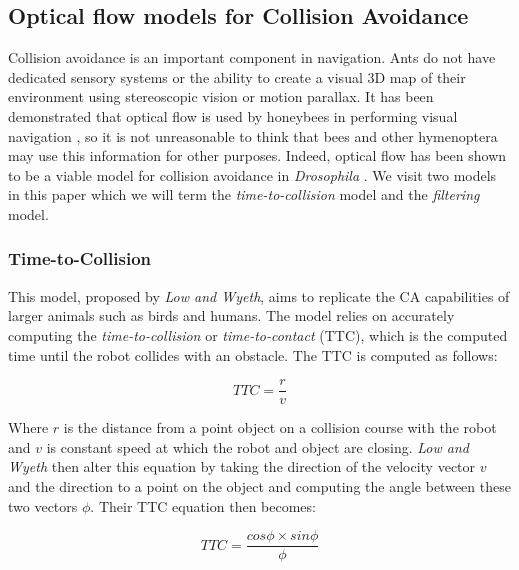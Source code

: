 \documentclass[a4paper,11pt,twoside,openright]{article}
\begin{document}
\subsection{ Optical flow models for Collision Avoidance } \label{sec:ofca}
Collision avoidance is an important component in navigation. Ants
do not have dedicated sensory systems or the ability to create a visual 3D map of their environment
using stereoscopic vision or motion parallax. It has been demonstrated that optical flow is used by
honeybees in performing visual navigation \cite{Dittmar2010}, so it is not unreasonable to
think that bees and other hymenoptera may use this information for other purposes. Indeed, optical
flow has been shown to be a viable model for collision avoidance in \textit{Drosophila}
\cite{Stewart2010}. We visit two models in this paper which we will term the
\textit{time-to-collision} model and the \textit{filtering} model.

\subsubsection{ Time-to-Collision }
This model, proposed by \textit{Low and Wyeth}\cite{Low2005}, aims to replicate the CA capabilities
of larger animals such as birds and humans. The model relies on accurately computing the
\textit{time-to-collision} or \textit{time-to-contact} (TTC), which is the computed time until the
robot collides with an obstacle. The TTC is computed as follows:

\begin{equation}
  \label{eqn:lowttc}
TTC = \frac{r}{v}
\end{equation}

Where $r$ is the distance from a point object on a collision course with the robot and $v$ is
constant speed at which the robot and object are closing.
\newline
\textit{Low and Wyeth} then alter this equation by taking the direction of the velocity vector $v$
and the direction to a point on the object and computing the angle between these two vectors $\phi$.
Their TTC equation then becomes:

\begin{equation}
 TTC = \frac{cos\phi \times sin\phi}{\phi}
\end{equation}
\end{document}
